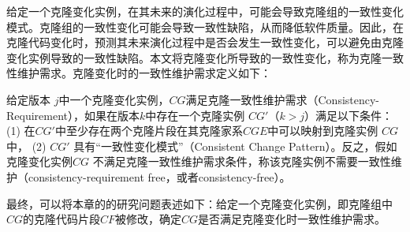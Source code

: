 

给定一个克隆变化实例，在其未来的演化过程中，可能会导致克隆组的一致性变化模式。克隆组的一致性变化可能会导致一致性缺陷，从而降低软件质量。因此，在克隆代码变化时，预测其未来演化过程中是否会发生一致性变化，可以避免由克隆变化实例导致的一致性缺陷。本文将克隆变化所导致的一致性变化，称为克隆一致性维护需求。克隆变化时的一致性维护需求定义如下：\\

\begin{definition}
 \label{def-changingrequirement}
给定版本 $j$中一个克隆变化实例，$CG$满足克隆一致性维护需求（Consistency-Requirement），如果在版本$k$中存在一个克隆实例 $CG'$（$k>j$）满足以下条件： (1) 在$CG'$中至少存在两个克隆片段在其克隆家系$CGE$中可以映射到克隆实例 $CG$中， (2) $CG'$ 具有“一致性变化模式”（Consistent Change Pattern）。反之，假如克隆变化实例$CG$ 不满足克隆一致性维护需求条件，称该克隆实例不需要一致性维护（consistency-requirement free，或者consistency-free）。
\end{definition}


最终，可以将本章的的研究问题表述如下：给定一个克隆变化实例，即克隆组中$CG$的克隆代码片段$CF$被修改，确定$CG $是否满足克隆变化时一致性维护需求。

